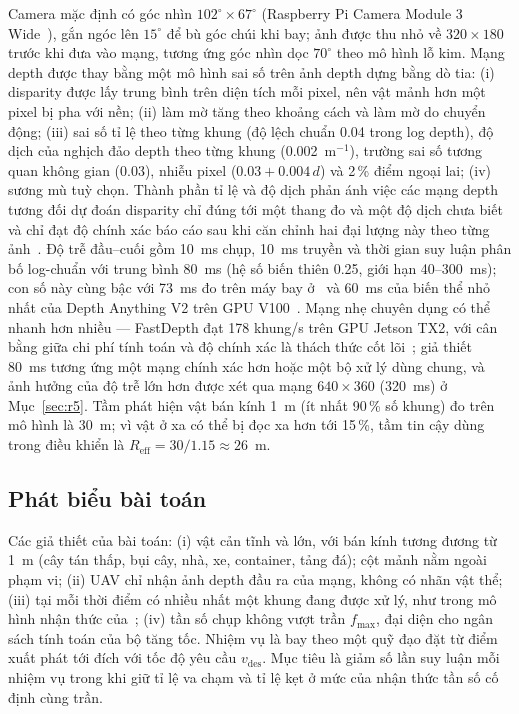 \documentclass[11pt,a4paper]{article}
\theoremstyle{plain}
\theoremstyle{definition}
\theoremstyle{remark}
\newcommand{\fmax}{f_{\max}}
\newcommand{\Reff}{R_{\mathrm{eff}}}
\begin{document}
Camera mặc định có góc nhìn $102^\circ\times67^\circ$ (Raspberry Pi Camera Module 3 Wide~\cite{rpi_cm3}), gắn ngóc lên $15^\circ$ để bù góc chúi khi bay; ảnh được thu nhỏ về $320\times180$ trước khi đưa vào mạng, tương ứng góc nhìn dọc $70^\circ$ theo mô hình lỗ kim. Mạng depth được thay bằng một mô hình sai số trên ảnh depth dựng bằng dò tia: (i) disparity được lấy trung bình trên diện tích mỗi pixel, nên vật mảnh hơn một pixel bị pha với nền; (ii) làm mờ tăng theo khoảng cách và làm mờ do chuyển động; (iii) sai số tỉ lệ theo từng khung (độ lệch chuẩn 0.04 trong log depth), độ dịch của nghịch đảo depth theo từng khung (0.002~m$^{-1}$), trường sai số tương quan không gian (0.03), nhiễu pixel ($0.03 + 0.004\,d$) và 2\,\% điểm ngoại lai; (iv) sương mù tuỳ chọn. Thành phần tỉ lệ và độ dịch phản ánh việc các mạng depth tương đối dự đoán disparity chỉ đúng tới một thang đo và một độ dịch chưa biết~\cite{ranftl2020,yang2024a,yang2024b} và chỉ đạt độ chính xác báo cáo sau khi căn chỉnh hai đại lượng này theo từng ảnh~\cite{ranftl2020}. Độ trễ đầu--cuối gồm 10~ms chụp, 10~ms truyền và thời gian suy luận phân bố log-chuẩn với trung bình 80~ms (hệ số biến thiên 0.25, giới hạn 40--300~ms); con số này cùng bậc với 73~ms đo trên máy bay ở~\cite{bhattacharya2024} và 60~ms của biến thể nhỏ nhất của Depth Anything V2 trên GPU V100~\cite{yang2024b}. Mạng nhẹ chuyên dụng có thể nhanh hơn nhiều --- FastDepth đạt 178 khung/s trên GPU Jetson TX2, với cân bằng giữa chi phí tính toán và độ chính xác là thách thức cốt lõi~\cite{wofk2019}; giả thiết 80~ms tương ứng một mạng chính xác hơn hoặc một bộ xử lý dùng chung, và ảnh hưởng của độ trễ lớn hơn được xét qua mạng $640\times360$ (320~ms) ở Mục~\ref{sec:r5}. Tầm phát hiện vật bán kính 1~m (ít nhất 90\,\% số khung) đo trên mô hình là 30~m; vì vật ở xa có thể bị đọc xa hơn tới 15\,\%, tầm tin cậy dùng trong điều khiển là $\Reff = 30/1.15 \approx 26$~m.

\subsection{Phát biểu bài toán}

Các giả thiết của bài toán: (i) vật cản tĩnh và lớn, với bán kính tương đương từ 1~m (cây tán thấp, bụi cây, nhà, xe, container, tảng đá); cột mảnh nằm ngoài phạm vi; (ii) UAV chỉ nhận ảnh depth đầu ra của mạng, không có nhãn vật thể; (iii) tại mỗi thời điểm có nhiều nhất một khung đang được xử lý, như trong mô hình nhận thức của~\cite{aldana2023}; (iv) tần số chụp không vượt trần $\fmax$, đại diện cho ngân sách tính toán của bộ tăng tốc. Nhiệm vụ là bay theo một quỹ đạo đặt từ điểm xuất phát tới đích với tốc độ yêu cầu $v_{\mathrm{des}}$. Mục tiêu là giảm số lần suy luận mỗi nhiệm vụ trong khi giữ tỉ lệ va chạm và tỉ lệ kẹt ở mức của nhận thức tần số cố định cùng trần.
\end{document}
